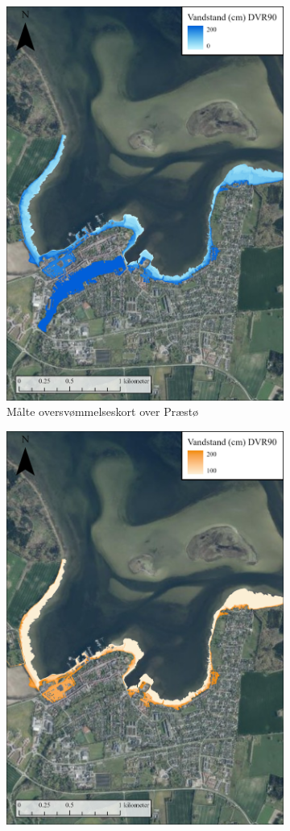\begin{figure}[H]
    \begin{subfigure}[t]{0.5\textwidth}
        \centering
        \includegraphics[width=0.8\linewidth]{images/Resultater/2023Malt/2023 resultat_praestoe.jpg}
        \caption{Målte oversvømmelseskort over Præstø}
        \label{Subfig: Målt Præstø}
    \end{subfigure}
    \begin{subfigure}[t]{0.5\textwidth}
        \centering
        \includegraphics[width=0.8\linewidth]{images/Resultater/2023Model/2023 model_praestoe.jpg}

\end{subfigure}
\end{figure}
